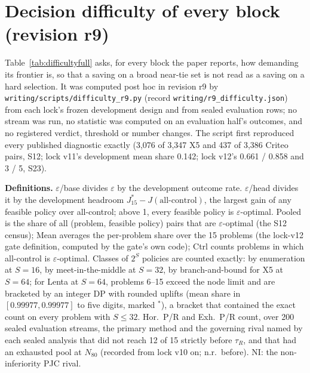 \documentclass[sigconf,anonymous,review]{acmart}
\newcommand{\eps}{\varepsilon}
\begin{document}
\section{Decision difficulty of every block (revision r9)}\label{app:difficulty}

Table~\ref{tab:difficultyfull} asks, for every block the paper reports, how demanding its frontier is, so that a saving on a broad near-tie set is not read as a saving on a hard selection. It was computed post hoc in revision r9 by \texttt{writing/scripts/difficulty\_r9.py} (record \texttt{writing/r9\_difficulty.json}) from each lock's frozen development design and from sealed evaluation rows; no stream was run, no statistic was computed on an evaluation half's outcomes, and no registered verdict, threshold or number changes. The script first reproduced every published diagnostic exactly (3,076 of 3,347 X5 and 437 of 3,386 Criteo pairs, S12; lock v11's development mean share 0.142; lock v12's 0.661 / 0.858 and 3 / 5, S23).

\textbf{Definitions.} $\eps$/base divides $\eps$ by the development outcome rate. $\eps$/head divides it by the development headroom $J^*_{15} - J(\text{all-control})$, the largest gain of any feasible policy over all-control; above 1, every feasible policy is $\eps$-optimal. Pooled is the share of all (problem, feasible policy) pairs that are $\eps$-optimal (the S12 census); Mean averages the per-problem share over the 15 problems (the lock-v12 gate definition, computed by the gate's own code); Ctrl counts problems in which all-control is $\eps$-optimal. Classes of $2^S$ policies are counted exactly: by enumeration at $S = 16$, by meet-in-the-middle at $S = 32$, by branch-and-bound for X5 at $S = 64$; for Lenta at $S = 64$, problems 6--15 exceed the node limit and are bracketed by an integer DP with rounded uplifts (mean share in $[0.99977, 0.99977]$ to five digits, marked $^*$), a bracket that contained the exact count on every problem with $S \le 32$. Hor.\ P/R and Exh.\ P/R count, over 200 sealed evaluation streams, the primary method and the governing rival named by each sealed analysis that did not reach 12 of 15 strictly before $\tau_R$, and that had an exhausted pool at $N_{80}$ (recorded from lock v10 on; n.r.\ before). NI: the non-inferiority PJC rival.

\begin{table}[t]
\caption{\textbf{Decision difficulty of every reported block} (post hoc, revision r9). Development columns use development truth; evaluation columns use sealed evaluation rows only. $^\dagger$Descriptive blocks. $^*$Exact bracket (see text).}
\label{tab:difficultyfull}
\small

\end{table}
\end{document}
